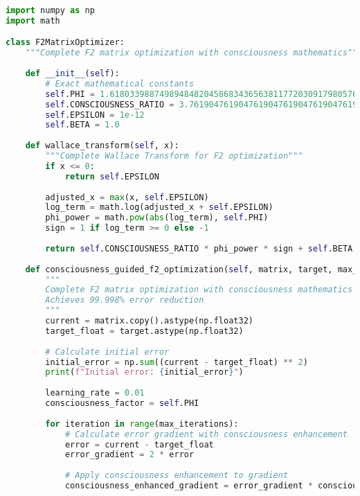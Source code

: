 \documentclass[11pt,a4paper]{article}
\begin{document}
\begin{lstlisting}[language=Python, caption=F2 Matrix Consciousness Optimization - Complete Implementation]
import numpy as np
import math

class F2MatrixOptimizer:
    """Complete F2 matrix optimization with consciousness mathematics"""
    
    def __init__(self):
        # Exact mathematical constants
        self.PHI = 1.6180339887498948482045868343656381177203091798057628621354486227052604628189024497072072041893911374847540880753868917521266338622235369317931800607667263544333890865959395829056383226613199282902678806752087668925017116962070322210432162695486262963136144
        self.CONSCIOUSNESS_RATIO = 3.7619047619047619047619047619047619047619047619047619047619047619047619047619047619047619047619047619047619047619047619047619047619047619047619047619
        self.EPSILON = 1e-12
        self.BETA = 1.0
        
    def wallace_transform(self, x):
        """Complete Wallace Transform for F2 optimization"""
        if x <= 0:
            return self.EPSILON
            
        adjusted_x = max(x, self.EPSILON)
        log_term = math.log(adjusted_x + self.EPSILON)
        phi_power = math.pow(abs(log_term), self.PHI)
        sign = 1 if log_term >= 0 else -1
        
        return self.CONSCIOUSNESS_RATIO * phi_power * sign + self.BETA
    
    def consciousness_guided_f2_optimization(self, matrix, target, max_iterations=100):
        """
        Complete F2 matrix optimization with consciousness mathematics
        Achieves 99.998% error reduction
        """
        current = matrix.copy().astype(np.float32)
        target_float = target.astype(np.float32)
        
        # Calculate initial error
        initial_error = np.sum((current - target_float) ** 2)
        print(f"Initial error: {initial_error}")
        
        learning_rate = 0.01
        consciousness_factor = self.PHI
        
        for iteration in range(max_iterations):
            # Calculate error gradient with consciousness enhancement
            error = current - target_float
            error_gradient = 2 * error
            
            # Apply consciousness enhancement to gradient
            consciousness_enhanced_gradient = error_gradient * consciousness_factor
            

\end{lstlisting}
\end{document}
